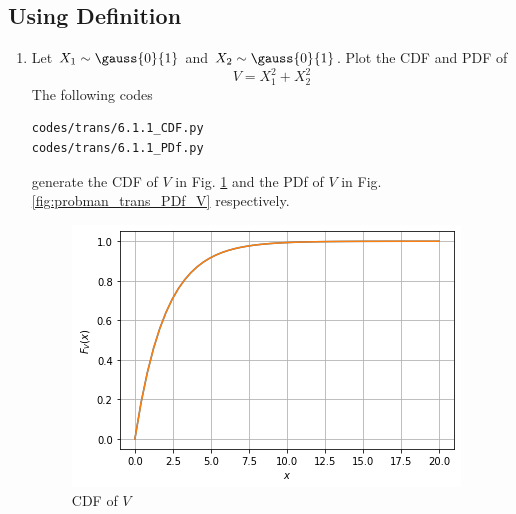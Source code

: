 \renewcommand{\theequation}{\theenumi}
\renewcommand{\thefigure}{\theenumi}

\subsection{Using Definition}
\begin{enumerate}[label=\thesubsection.\arabic*.,ref=\thesubsection.\theenumi]

%
\item
Let $X_1 \sim  \gauss{0}{1}$ and $X_2 \sim  \gauss{0}{1}$. Plot the CDF and PDF of
%
\begin{equation}
V = X_1^2 + X_2^2 
\end{equation}
%
\solution The following codes
\begin{lstlisting}
codes/trans/6.1.1_CDF.py
codes/trans/6.1.1_PDf.py
\end{lstlisting}
generate the CDF of $V$  in Fig. \ref{fig:probman_trans_cdf_V} and the PDf of $V$ in Fig. \ref{fig:probman_trans_PDf_V} respectively.
\begin{figure}[!ht]
\centering
\includegraphics[width=\columnwidth]{figs/trans/6.1.1 cdf.png}
\caption{CDF of $V$}
\label{fig:probman_trans_cdf_V}
\end{figure}
%
\begin{figure}[!ht]
\centering

\end{figure}
\end{enumerate}
